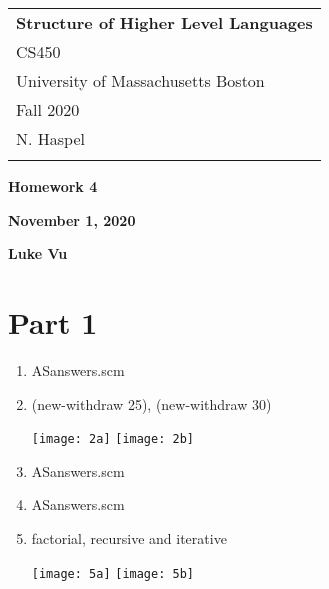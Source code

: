 \documentclass[a4paper,12pt]{article}
\begin{document}
	\thispagestyle{empty}
	
	\begin{tabular}{p{15.5cm}}
		{\large \bf Structure of Higher Level Languages} \\ CS450 \\
		University of Massachusetts Boston \\ Fall 2020  \\ N. Haspel\\
		\hline
		\\
	\end{tabular}

	\vspace*{0.1cm}
	
	\begin{center}
		{\Large \bf Homework 4}
		\vspace{1mm}
		
		{\bf November 1, 2020}
		\vspace{1mm}
		
		{\bf Luke Vu}	
	\end{center} 

	\vspace*{0.5cm}
	
\section{Part 1}
\begin{enumerate}
\item ASanswers.scm
\item (new-withdraw 25), (new-withdraw 30)
\begin{center}
\texttt{[image: 2a]}
\texttt{[image: 2b]}
\end{center}
\item ASanswers.scm
\item ASanswers.scm
\item factorial, recursive and iterative
\begin{center}
\texttt{[image: 5a]}
\texttt{[image: 5b]}
\end{center}
\end{enumerate}
\end{document}
